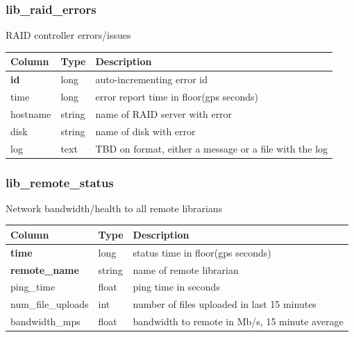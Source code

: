 \documentclass{article}
\begin{document}
\subsubsection{lib\_raid\_errors}
RAID controller errors/issues
\begin{center}
 \begin{tabular}{| p{4cm} | p{2cm} | p{10cm} |}
\hline
 {\bf Column} & {\bf Type}  & {\bf Description} \\ [0.5ex]  \hline\hline
\textbf{id} & long & auto-incrementing error id\\ \hline
time & long & error report time in floor(gps seconds)\\ \hline
hostname & string & name of RAID server with error \\ \hline
disk & string & name of disk with error \\ \hline
log & text & TBD on format, either a message or a file with the log \\\hline
\end{tabular}
\end{center}

\subsubsection{lib\_remote\_status}
Network bandwidth/health to all remote librarians
\begin{center}
 \begin{tabular}{| p{4cm} | p{2cm} | p{10cm} |}
\hline
 {\bf Column} & {\bf Type}  & {\bf Description} \\ [0.5ex]  \hline\hline
\textbf{time} & long & status time in floor(gps seconds)\\ \hline
\textbf{remote\_name} & string & name of remote librarian \\ \hline
ping\_time & float & ping time in seconds \\\hline
num\_file\_uploads & int & number of files uploaded in last 15 minutes  \\\hline
bandwidth\_mps & float & bandwidth to remote in Mb/s, 15 minute average \\\hline
\end{tabular}
\end{center}
\end{document}
